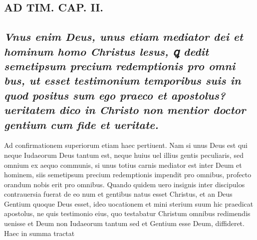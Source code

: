 \documentclass{article}
\begin{document}
\begin{pages}
\section*{AD TIM. CAP. II. }
\marginpar{[ p.117 ]}
{}
\subsection*{\textit{Vnus enim Deus, unus etiam mediator dei et hominum homo Christus lesus, ꝗ dedit semetipsum precium redemptionis pro omni bus, ut esset testimonium temporibus suis in quod positus sum ego praeco et apostolus? ueritatem dico in Christo non mentior doctor gentium cum fide et ueritate. }}\pstart Ad confirmationem superiorum etiam haec pertiuent. Nam si unus Deus est qui neque Iudaeorum Deus tantum est, neque huius uel illius gentis peculiaris, sed omnium ex aequo communis, si unus totius carnis mediator est inter Deum et hominem, siis semetipsum precium redemptionis impendit pro omnibus, profecto orandum nobis erit pro omnibus. Quando quidem uero insignis inter discipulos contrauersia fuerat de eo num et gentibus natus esset Christus, et an Deus Gentium quoque Deus esset, ideo uocationem et mini sterium suum hic praedicat apostolus, ne quis testimonio eius, quo testabatur Christum omnibus redimendis uenisse et Deum non Iudaeorum tantum sed et Gentium esse Deum, diffideret. Haec in summa tractat  \pend

\end{pages}
\end{document}
